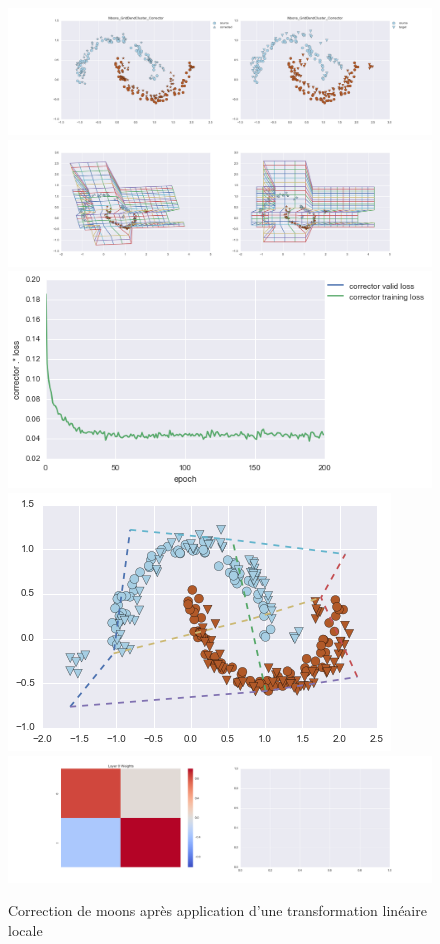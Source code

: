 \begin{figure}[H] %
\centering
\includegraphics[width=\linewidth]{fig/24-05-2016/moons/Moons_GridBendCluster_Corrector-DATA.png}
\includegraphics[width=\linewidth]{fig/24-05-2016/moons/Moons_GridBendCluster_Corrector-GridCheck.png}
\includegraphics[width=0.45\linewidth]{fig/24-05-2016/moons/Moons_GridBendCluster_Corrector-Learning_curve.png}
\includegraphics[width=0.45\linewidth]{fig/24-05-2016/moons/moons_grid.png}
\includegraphics[width=\linewidth]{fig/24-05-2016/moons/Moons_GridBendCluster_Corrector-W.png}
\caption{Correction de moons après application d'une transformation linéaire locale}
\label{fig:recap-moons-GridBend-cluster}
\end{figure}


